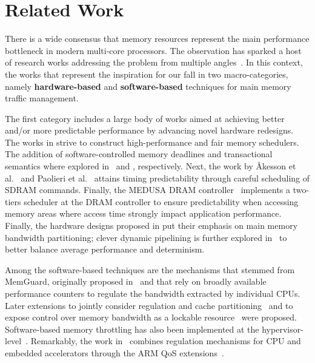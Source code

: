 \section{Related Work}
There is a wide consensus that memory resources represent the main
performance bottleneck in modern multi-core processors. The
observation has sparked a host of research works addressing the
problem from multiple angles~\cite{temp_reg_survey}. In this context,
the works that represent the inspiration for our \schim fall in two
macro-categories, namely \textbf{hardware-based} and
\textbf{software-based} techniques for main memory traffic management.

The first category includes a large body of works aimed at achieving
better and/or more predictable performance by advancing novel hardware
redesigns. The works in \cite{mutlu2007stall, mutlu2008parallelism,
  nesbit2006fair} strive to construct high-performance and fair memory
schedulers. The addition of software-controlled memory deadlines and
transactional semantics where explored in~\cite{usui2016dash} and
\cite{ferri2011soc}, respectively. Next, the work by Åkesson et
al.~\cite{akesson2007predator, akesson2010predictable} and Paolieri et
al.~\cite{paolieri2009analyzable} attains timing predictability
through careful scheduling of SDRAM commands. Finally, the MEDUSA DRAM
controller~\cite{valsan2015medusa, detmem2018} implements a two-tiers
scheduler at the DRAM controller to ensure predictability when
accessing memory areas where access time strongly impact application
performance. Finally, the hardware designs proposed in
\cite{zhou2016mitts, rafique2007effective, Farshchi2020BRUBR} put
their emphasis on main memory bandwidth partitioning; clever dynamic
pipelining is further explored in~\cite{drambulism2020rtas} to better
balance average performance and determinism.

Among the software-based techniques are the mechanisms that stemmed
from MemGuard, originally proposed in~\cite{memguard2013} and that
rely on broadly available performance counters to regulate the
bandwidth extracted by individual CPUs. Later extensions to jointly
consider regulation and cache partitioning~\cite{holistic2019rtas} and
to expose control over memory bandwidth as a lockable
resource~\cite{bwlockyun2017} were proposed. Software-based memory
throttling has also been implemented at the
hypervisor-level~\cite{xvisor2018, ewarp2020rtss}. Remarkably, the
work in~\cite{ewarp2020rtss} combines regulation mechanisms for CPU
and embedded accelerators through the ARM QoS
extensions~\cite{qos-400}.

